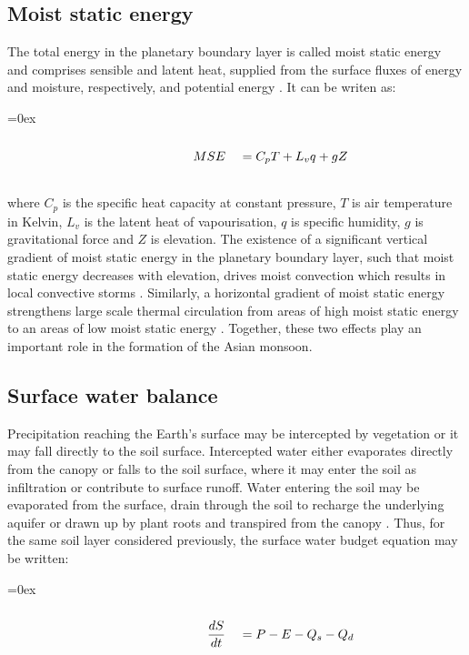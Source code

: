 \documentclass{icldt}\usepackage[]{graphicx}\usepackage[]{color}
\def\leftalgn{0.45}\def\rightalgn{0.45}
\def\algnrow{\rule{\leftalgn\textwidth}{0ex}&\rule{\rightalgn\textwidth}{0ex}}
\newenvironment{algneqn}{%
  \arraycolsep=0ex\renewcommand\arraystretch{0}%
  \begin{equation}%
  \begin{array}{rl}%
  \algnrow\\}%
 {\\\algnrow%
  \end{array}%
  \end{equation}\ignorespacesafterend%
}
\begin{document}
\subsection{Moist static energy}

The total energy in the planetary boundary layer is called moist static energy and comprises sensible and latent heat, supplied from the surface fluxes of energy and moisture, respectively, and potential energy \citep{Eltahir1998,Prive2007a}. It can be writen as:

\begin{algneqn} \label{eq:mse}
MSE\ &= C_{p}T + L_{v}q + gZ
\end{algneqn}

\noindent where $ C_{p} $ is the specific heat capacity at constant pressure, $ T $ is air temperature in Kelvin, $ L_{v} $ is the latent heat of vapourisation, $ q $ is specific humidity, $ g $ is gravitational force and $ Z $ is elevation. The existence of a significant vertical gradient of moist static energy in the planetary boundary layer, such that moist static energy decreases with elevation, drives moist convection which results in local convective storms \citep{Eltahir1998,Neelin2007,Barry2010}. Similarly, a horizontal gradient of moist static energy strengthens large scale thermal circulation from areas of high moist static energy to an areas of low moist static energy \citep{Eltahir1998,Zheng1998}. Together, these two effects play an important role in the formation of the Asian monsoon. \\

\subsection{Surface water balance}

Precipitation reaching the Earth's surface may be intercepted by vegetation or it may fall directly to the soil surface. Intercepted water either evaporates directly from the canopy or falls to the soil surface, where it may enter the soil as infiltration or contribute to surface runoff. Water entering the soil may be evaporated from the surface, drain through the soil to recharge the underlying aquifer or drawn up by plant roots and transpired from the canopy \citep{Pitman2003}. Thus, for the same soil layer considered previously, the surface water budget equation may be written:

\begin{algneqn} \label{eq:waterbudget}
\dfrac{dS}{dt}\ &= P - E - Q_{s} - Q_{d}
\end{algneqn}
\end{document}
